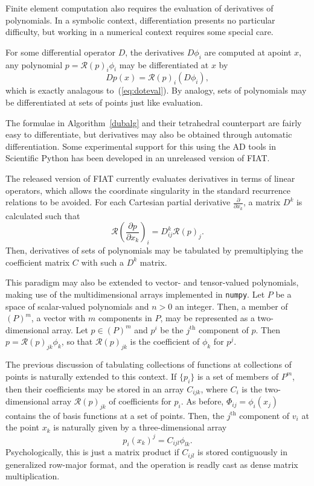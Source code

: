 Finite element computation also requires the evaluation of derivatives
of polynomials.  In a symbolic context, differentiation presents no
particular difficulty, but working in a numerical context requires
some special care.

For some differential operator \( D \), the derivatives
\( D \phi_i \) are computed at apoint \( x \), any polynomial
\( p = \mathcal{R}(p)_i \phi_i \) may be differentiated at \( x \) by
\[
Dp(x) = \mathcal{R}(p)_i (D\phi_i),
\]
which is exactly analagous to~(\ref{eq:doteval}).  By analogy, sets of
polynomials may be differentiated at sets of points just like
evaluation.

The formulae in Algorithm~\ref{dubalg} and their tetrahedral counterpart are
fairly easy to differentiate, but derivatives may also be obtained through
automatic differentiation.  Some experimental support for this using
the AD tools in Scientific Python has been developed in an unreleased
version of FIAT.

The released version of FIAT currently evaluates derivatives in terms
of linear operators, which allows the coordinate singularity in the
standard recurrence relations to be avoided.  For each Cartesian
partial derivative \( \frac{\partial}{\partial x_k} \), a matrix \(
D^k \) is calculated such that
\[
\mathcal{R}\left(\frac{\partial p}{\partial x_k}\right)_i
= D^k_{ij} \mathcal{R}(p)_j.
\]
Then, derivatives of sets of polynomials may be tabulated by
premultiplying the coefficient matrix \( C \) with such a \( D^k \) matrix.

This paradigm may also be extended to vector- and tensor-valued
polynomials, making use of the multidimensional arrays implemented in
\texttt{numpy}.  Let \( P \) be a space of scalar-valued polynomials and
\( n > 0 \) an integer.  Then, a member of \( (P)^m \), a vector with
\( m \) components in \( P \), may be represented as a two-dimensional
array.  Let \( p \in (P)^m \) and \( p^i \) be the \( j^\mathrm{th} \)
component of \( p \).  Then \( p = \mathcal{R}(p)_{jk} \phi_k \), so
that \( \mathcal{R}(p)_{jk} \) is the coefficient of \( \phi_k \) for
\( p^j \).

The previous discussion of tabulating collections of functions at
collections of points is naturally extended to this context.  If \( \{
p_i \} \) is a set of members of \( P^m \), then their coefficients
may be stored in an array \( C_{ijk} \), where \( C_i \) is the
two-dimensional array \( \mathcal{R}(p)_{jk} \) of coefficients for \(
p_i \).  As before, \( \Phi_{ij} = \phi_i(x_j) \) contains the of
basis functions at a set of points.  Then, the \( j^\mathrm{th} \)
component of \( v_i \) at the point \( x_k \) is naturally given by a
three-dimensional array
\[
p_i(x_k)^j = C_{ijl} \phi_{lk}.
\]
Psychologically, this is just a matrix product if \( C_{ijl} \)
is stored contiguously in generalized row-major format, and the
operation is readly cast as dense matrix multiplication.

